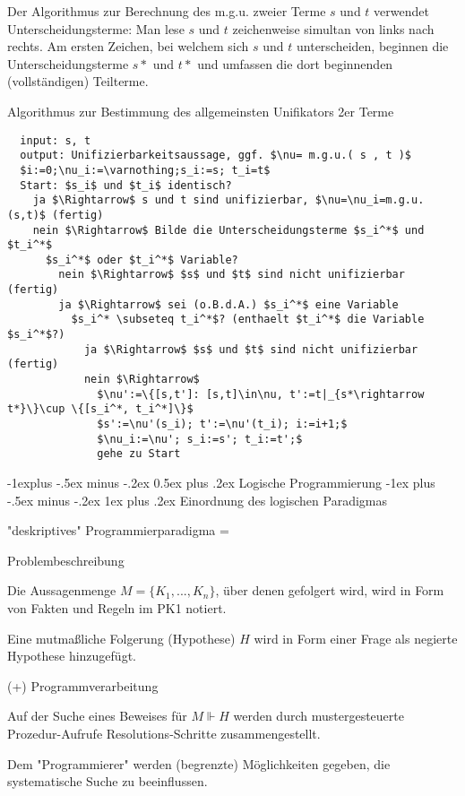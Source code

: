 \documentclass[a4paper]{article}
\makeatletter
\renewcommand{\subsection}{\@startsection{subsection}{2}{0mm}%
                {-1explus -.5ex minus -.2ex}%
                {0.5ex plus .2ex}%
                {\normalfont\normalsize\bfseries}}
\renewcommand{\subsubsection}{\@startsection{subsubsection}{3}{0mm}%
                {-1ex plus -.5ex minus -.2ex}%
                {1ex plus .2ex}%
                {\normalfont\small\bfseries}}
\makeatother
\begin{document}
\begin{multicols}{3}
  Der Algorithmus zur Berechnung des m.g.u. zweier Terme $s$ und $t$ verwendet Unterscheidungsterme: Man lese $s$ und $t$ zeichenweise simultan von links nach rechts. Am ersten Zeichen, bei welchem sich $s$ und $t$ unterscheiden, beginnen die Unterscheidungsterme $s*$ und $t*$ und umfassen die dort beginnenden (vollständigen) Teilterme.

  Algorithmus zur Bestimmung des allgemeinsten Unifikators 2er Terme

  \begin{lstlisting}
  input: s, t
  output: Unifizierbarkeitsaussage, ggf. $\nu= m.g.u.( s , t )$
  $i:=0;\nu_i:=\varnothing;s_i:=s; t_i=t$
  Start: $s_i$ und $t_i$ identisch?
    ja $\Rightarrow$ s und t sind unifizierbar, $\nu=\nu_i=m.g.u.(s,t)$ (fertig)
    nein $\Rightarrow$ Bilde die Unterscheidungsterme $s_i^*$ und $t_i^*$
      $s_i^*$ oder $t_i^*$ Variable?
        nein $\Rightarrow$ $s$ und $t$ sind nicht unifizierbar (fertig)
        ja $\Rightarrow$ sei (o.B.d.A.) $s_i^*$ eine Variable
          $s_i^* \subseteq t_i^*$? (enthaelt $t_i^*$ die Variable $s_i^*$?)
            ja $\Rightarrow$ $s$ und $t$ sind nicht unifizierbar (fertig)
            nein $\Rightarrow$ 
              $\nu':=\{[s,t']: [s,t]\in\nu, t':=t|_{s*\rightarrow t*}\}\cup \{[s_i^*, t_i^*]\}$
              $s':=\nu'(s_i); t':=\nu'(t_i); i:=i+1;$
              $\nu_i:=\nu'; s_i:=s'; t_i:=t';$ 
              gehe zu Start
  \end{lstlisting}

  \subsection{Logische Programmierung}
  \subsubsection{Einordnung des logischen Paradigmas}

  "deskriptives" Programmierparadigma =
  \begin{enumerate*}
    \item Problembeschreibung
    \begin{itemize*}
      \item Die Aussagenmenge $M =\{K_1,...,K_n\}$, über denen gefolgert wird, wird in Form von Fakten und Regeln im PK1 notiert.
      \item Eine mutmaßliche Folgerung (Hypothese) $H$ wird in Form einer Frage als negierte Hypothese hinzugefügt.
    \end{itemize*}
    \item (+) Programmverarbeitung
    \begin{itemize*}
      \item Auf der Suche eines Beweises für $M \Vdash H$ werden durch mustergesteuerte Prozedur-Aufrufe Resolutions-Schritte zusammengestellt.
      \item Dem "Programmierer" werden (begrenzte) Möglichkeiten gegeben, die systematische Suche zu beeinflussen.
    \end{itemize*}
  \end{enumerate*}


\end{multicols}
\end{document}
